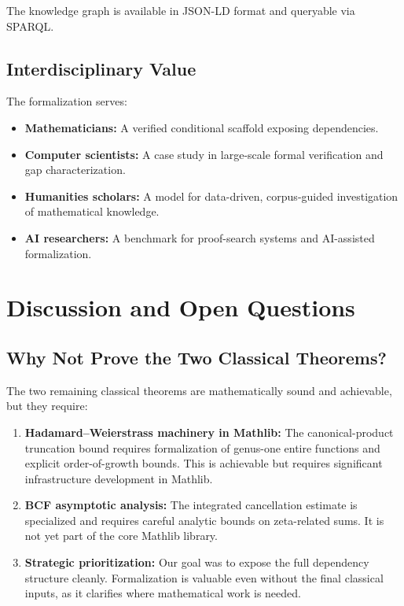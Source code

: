 \documentclass[11pt,a4paper]{article}
\begin{document}
The knowledge graph is available in JSON-LD format and queryable via SPARQL.

\subsection{Interdisciplinary Value}

The formalization serves:
\begin{itemize}
  \item \textbf{Mathematicians:} A verified conditional scaffold exposing dependencies.
  \item \textbf{Computer scientists:} A case study in large-scale formal verification and gap characterization.
  \item \textbf{Humanities scholars:} A model for data-driven, corpus-guided investigation of mathematical knowledge.
  \item \textbf{AI researchers:} A benchmark for proof-search systems and AI-assisted formalization.
\end{itemize}

\section{Discussion and Open Questions}
\label{sec:discussion}

\subsection{Why Not Prove the Two Classical Theorems?}

The two remaining classical theorems are mathematically sound and achievable, but they require:

\begin{enumerate}
  \item \textbf{Hadamard--Weierstrass machinery in Mathlib:} The canonical-product truncation bound requires formalization of genus-one entire functions and explicit order-of-growth bounds. This is achievable but requires significant infrastructure development in Mathlib.

  \item \textbf{BCF asymptotic analysis:} The integrated cancellation estimate is specialized and requires careful analytic bounds on zeta-related sums. It is not yet part of the core Mathlib library.

  \item \textbf{Strategic prioritization:} Our goal was to expose the full dependency structure cleanly. Formalization is valuable even without the final classical inputs, as it clarifies where mathematical work is needed.
\end{enumerate}
\end{document}
